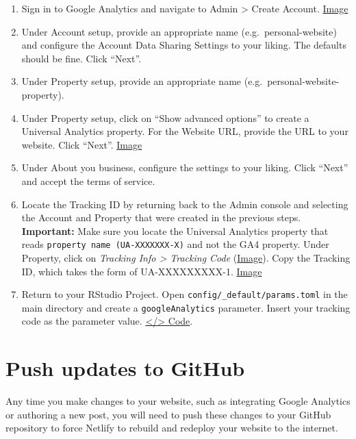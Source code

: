 \documentclass[
]{book}
\begin{document}
\begin{enumerate}
\def\labelenumi{\arabic{enumi}.}
\item
  Sign in to Google Analytics and navigate to Admin \textgreater{} Create Account. \href{https://i.imgur.com/QRTa07k.png}{Image}
\item
  Under Account setup, provide an appropriate name (e.g.~personal-website) and configure the Account Data Sharing Settings to your liking. The defaults should be fine. Click ``Next''.
\item
  Under Property setup, provide an appropriate name (e.g.~personal-website-property).
\item
  Under Property setup, click on ``Show advanced options'' to create a Universal Analytics property. For the Website URL, provide the URL to your website. Click ``Next''. \href{https://i.imgur.com/0jffYnF.png}{Image}
\item
  Under About you business, configure the settings to your liking. Click ``Next'' and accept the terms of service.
\item
  Locate the Tracking ID by returning back to the Admin console and selecting the Account and Property that were created in the previous steps. \textbf{Important:} Make sure you locate the Universal Analytics property that reads \texttt{property\ name\ (UA-XXXXXXX-X)} and not the GA4 property. Under Property, click on \emph{Tracking Info \textgreater{} Tracking Code} (\href{https://i.imgur.com/GtiKfhq.png}{Image}). Copy the Tracking ID, which takes the form of UA-XXXXXXXXX-1. \href{https://i.imgur.com/qcyaVBD.png}{Image}
\item
  Return to your RStudio Project. Open \texttt{config/\_default/params.toml} in the main directory and create a \texttt{googleAnalytics} parameter. Insert your tracking code as the parameter value. \href{https://github.com/dannymorris/r4sites-demo/blob/master/config/_default/params.toml\#L16-L17}{\textless/\textgreater{} Code}.
\end{enumerate}

\hypertarget{push-updates-to-github-1}{%
\section{Push updates to GitHub}\label{push-updates-to-github-1}}

Any time you make changes to your website, such as integrating Google Analytics or authoring a new post, you will need to push these changes to your GitHub repository to force Netlify to rebuild and redeploy your website to the internet.
\end{document}
